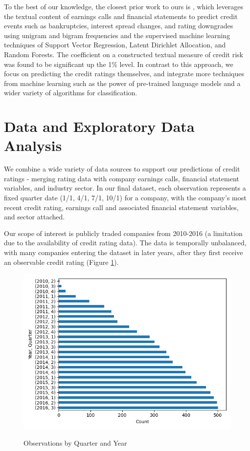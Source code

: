 \documentclass{article}[11pt]
\begin{document}
    To the best of our knowledge, the closest prior work to ours is \cite{donovan_measuring_2021}, which leverages the textual content of earnings calls and financial statements to predict credit events such as bankruptcies, interest spread changes, and rating downgrades using unigram and bigram frequencies and the supervised machine learning techniques of Support Vector Regression, Latent Dirichlet Allocation, and Random Forests. The coefficient on a constructed textual measure of credit risk was found to be significant up the 1\% level. In contrast to this approach, we focus on predicting the credit ratings themselves, and integrate more techniques from machine learning such as the power of pre-trained language models and a wider variety of algorithms for classification.

    \section*{Data and Exploratory Data Analysis}

    We combine a wide variety of data sources to support our predictions of credit ratings - merging rating data with company earnings calls, financial statement variables, and industry sector. In our final dataset, each observation represents a fixed quarter date (1/1, 4/1, 7/1, 10/1) for a company, with the company's most recent credit rating, earnings call and associated financial statement variables, and sector attached.

    Our scope of interest is publicly traded companies from 2010-2016 (a limitation due to the availability of credit rating data). The data is temporally unbalanced, with many companies entering the dataset in later years, after they first receive an observable credit rating (Figure \ref{fig:obs-by-quarter-year}).

    \begin{figure}[h!]
		\centering
        \caption{Observations by Quarter and Year}
        \includegraphics[width=0.5\linewidth,keepaspectratio=true]{../Output/All Data EDA/Tabular EDA/all_data_fixed_quarter_dates_obs_by_year_quarter_no_title.png}
        \label{fig:obs-by-quarter-year}
	\end{figure}
\end{document}
